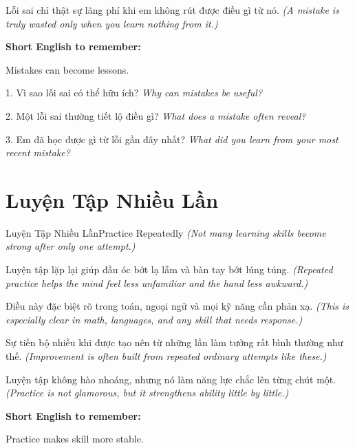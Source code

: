 \begin{baihoc}
Lỗi sai chỉ thật sự lãng phí khi em không rút được điều gì từ nó.
\textit{(A mistake is truly wasted only when you learn nothing from it.)}
\end{baihoc}

\begin{ghinhoanh}
\textbf{Short English to remember:}

Mistakes can become lessons.

\end{ghinhoanh}

\begin{tuhocnhanh}
1. Vì sao lỗi sai có thể hữu ích? \textit{Why can mistakes be useful?}

2. Một lỗi sai thường tiết lộ điều gì? \textit{What does a mistake often reveal?}

3. Em đã học được gì từ lỗi gần đây nhất? \textit{What did you learn from your most recent mistake?}
\end{tuhocnhanh}
\ngancach

\section{Luyện Tập Nhiều Lần}
\begin{truyen}{Luyện Tập Nhiều Lần}{Practice Repeatedly}
\textit{(Not many learning skills become strong after only one attempt.)}

Luyện tập lặp lại giúp đầu óc bớt lạ lẫm và bàn tay bớt lúng túng.
\textit{(Repeated practice helps the mind feel less unfamiliar and the hand less awkward.)}

Điều này đặc biệt rõ trong toán, ngoại ngữ và mọi kỹ năng cần phản xạ.
\textit{(This is especially clear in math, languages, and any skill that needs response.)}

Sự tiến bộ nhiều khi được tạo nên từ những lần làm tưởng rất bình thường như thế.
\textit{(Improvement is often built from repeated ordinary attempts like these.)}
\end{truyen}

\begin{baihoc}
Luyện tập không hào nhoáng, nhưng nó làm năng lực chắc lên từng chút một.
\textit{(Practice is not glamorous, but it strengthens ability little by little.)}
\end{baihoc}

\begin{ghinhoanh}
\textbf{Short English to remember:}

Practice makes skill more stable.

\end{ghinhoanh}


